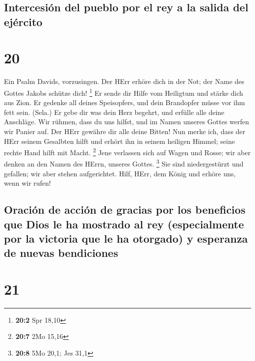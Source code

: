 \hypertarget{intercesiuxf3n-del-pueblo-por-el-rey-a-la-salida-del-ejuxe9rcito}{%
\subsection{Intercesión del pueblo por el rey a la salida del
ejército}\label{intercesiuxf3n-del-pueblo-por-el-rey-a-la-salida-del-ejuxe9rcito}}

\hypertarget{section-19}{%
\section{20}\label{section-19}}

 Ein Psalm Davids, vorzusingen.  Der HErr
erhöre dich in der Not; der Name des Gottes Jakobs schütze dich!
\footnote{\textbf{20:2} Spr 18,10}  Er sende dir Hilfe vom
Heiligtum und stärke dich aus Zion.  Er gedenke all deines
Speisopfers, und dein Brandopfer müsse vor ihm fett sein. (Sela.)
 Er gebe dir was dein Herz begehrt, und erfülle alle deine
Anschläge.  Wir rühmen, dass du uns hilfst, und im Namen
unseres Gottes werfen wir Panier auf. Der HErr gewähre dir alle deine
Bitten!  Nun merke ich, dass der HErr seinem Gesalbten
hilft und erhört ihn in seinem heiligen Himmel; seine rechte Hand hilft
mit Macht. \footnote{\textbf{20:7} 2Mo 15,16}  Jene
verlassen sich auf Wagen und Rosse; wir aber denken an den Namen des
HErrn, unseres Gottes. \footnote{\textbf{20:8} 5Mo 20,1; Jes 31,1}
 Sie sind niedergestürzt und gefallen; wir aber stehen
aufgerichtet.  Hilf, HErr, dem König und erhöre uns, wenn
wir rufen!

\hypertarget{oraciuxf3n-de-acciuxf3n-de-gracias-por-los-beneficios-que-dios-le-ha-mostrado-al-rey-especialmente-por-la-victoria-que-le-ha-otorgado-y-esperanza-de-nuevas-bendiciones}{%
\subsection{Oración de acción de gracias por los beneficios que Dios le
ha mostrado al rey (especialmente por la victoria que le ha otorgado) y
esperanza de nuevas
bendiciones}\label{oraciuxf3n-de-acciuxf3n-de-gracias-por-los-beneficios-que-dios-le-ha-mostrado-al-rey-especialmente-por-la-victoria-que-le-ha-otorgado-y-esperanza-de-nuevas-bendiciones}}

\hypertarget{section-20}{%
\section{21}\label{section-20}}

